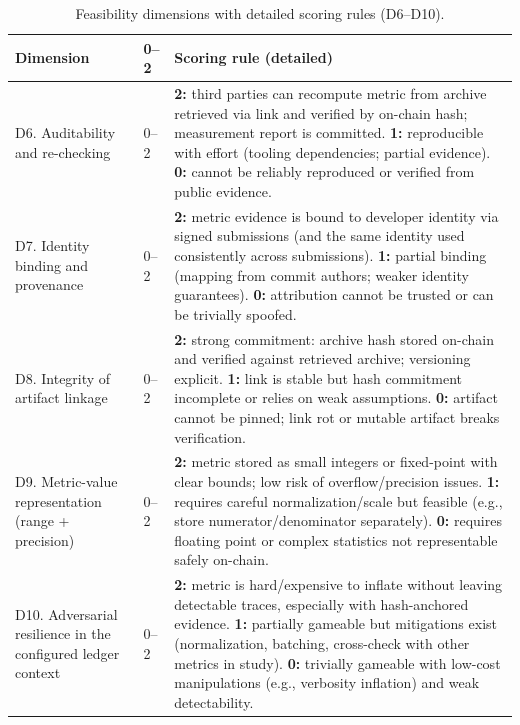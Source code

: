 \begin{table}[H]
\centering
\scriptsize
\renewcommand{\arraystretch}{1.14}
\begin{tabularx}{\textwidth}{p{2.8cm}p{0.8cm}X}
\toprule
\textbf{Dimension} & \textbf{0--2} & \textbf{Scoring rule (detailed)} \\
\midrule
D6. Auditability and re-checking & 0--2 &
\textbf{2:} third parties can recompute metric from archive retrieved via link and verified by on-chain hash; measurement report is committed.
\textbf{1:} reproducible with effort (tooling dependencies; partial evidence).
\textbf{0:} cannot be reliably reproduced or verified from public evidence. \\

D7. Identity binding and provenance & 0--2 &
\textbf{2:} metric evidence is bound to developer identity via signed submissions (and the same identity used consistently across submissions).
\textbf{1:} partial binding (mapping from commit authors; weaker identity guarantees).
\textbf{0:} attribution cannot be trusted or can be trivially spoofed. \\

D8. Integrity of artifact linkage & 0--2 &
\textbf{2:} strong commitment: archive hash stored on-chain and verified against retrieved archive; versioning explicit.
\textbf{1:} link is stable but hash commitment incomplete or relies on weak assumptions.
\textbf{0:} artifact cannot be pinned; link rot or mutable artifact breaks verification. \\

D9. Metric-value representation (range + precision) & 0--2 &
\textbf{2:} metric stored as small integers or fixed-point with clear bounds; low risk of overflow/precision issues.
\textbf{1:} requires careful normalization/scale but feasible (e.g., store numerator/denominator separately).
\textbf{0:} requires floating point or complex statistics not representable safely on-chain. \\

D10. Adversarial resilience in the configured ledger context & 0--2 &
\textbf{2:} metric is hard/expensive to inflate without leaving detectable traces, especially with hash-anchored evidence.
\textbf{1:} partially gameable but mitigations exist (normalization, batching, cross-check with other metrics in study).
\textbf{0:} trivially gameable with low-cost manipulations (e.g., verbosity inflation) and weak detectability. \\
\bottomrule
\end{tabularx}
\caption{Feasibility dimensions with detailed scoring rules (D6--D10).}
\label{tab:feasibility_dimensions_cont}
\end{table}

